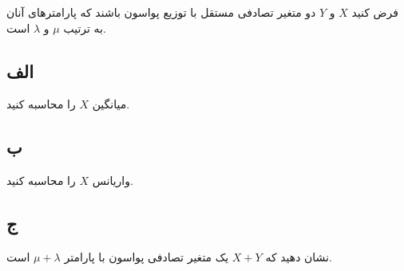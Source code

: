 فرض کنید $X$ و $Y$ دو متغیر تصادفی مستقل با توزیع پواسون باشند که پارامترهای آنان به ترتیب $\mu$ و $\lambda$ است.

\subsection*{الف}
میانگین $X$ را محاسبه کنید.

\subsection*{ب}
واریانس $X$ را محاسبه کنید.


\subsection*{ج}
نشان دهید که $X+Y$ یک متغیر تصادفی پواسون با پارامتر
$
\mu + \lambda
$
است.